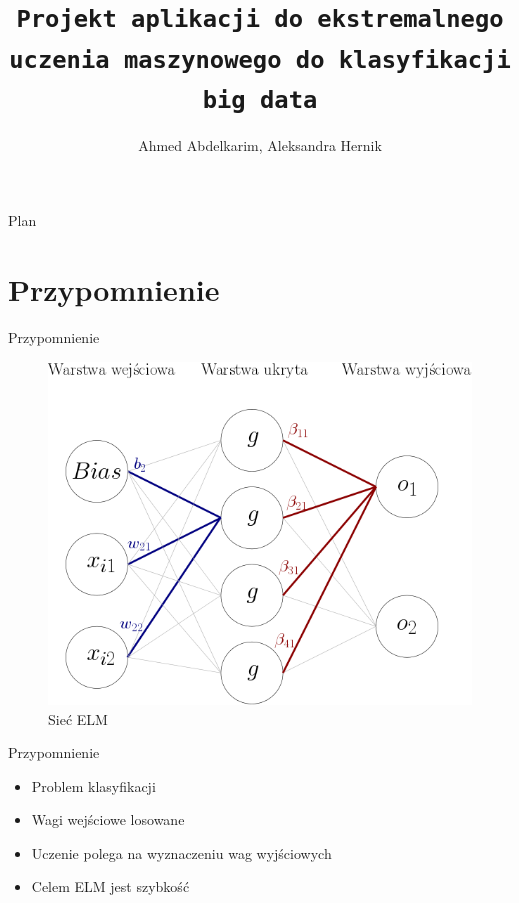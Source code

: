 \documentclass{beamer}
\title{\texttt{Projekt aplikacji do ekstremalnego uczenia maszynowego do klasyfikacji big data}}
\author{Ahmed Abdelkarim, Aleksandra Hernik}
\begin{document}


\begin{frame}
  \maketitle
\end{frame}

\begin{frame}{Plan}
  \tableofcontents[currentsection]
\end{frame}

\section{Przypomnienie}
\begin{frame}{Przypomnienie}
\begin{figure}[H]
\includegraphics[scale=0.5]{schemat_sieci.png}
\caption{Sieć ELM}
\end{figure}
\end{frame}
\begin{frame}{Przypomnienie}
\begin{itemize}
\item Problem klasyfikacji
\item Wagi wejściowe losowane
\item Uczenie polega na wyznaczeniu wag wyjściowych
\item Celem ELM jest szybkość
\end{itemize}
\end{frame}
\end{document}

